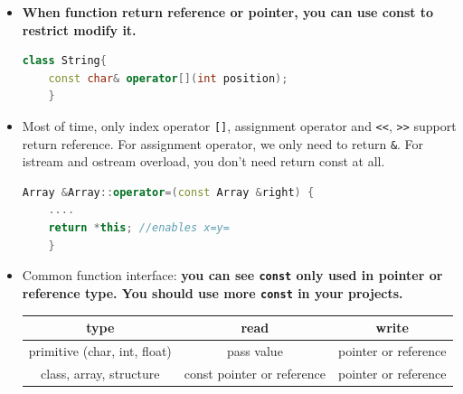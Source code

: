 \documentclass[a4paper,12pt,twoside]{book}
\begin{document}
\begin{itemize}
	\item \textbf{When function return reference or pointer, you can use const to restrict modify it.}
	\begin{lstlisting}[frame=single, language=c++]
	class String{
	const char& operator[](int position);
	}
	\end{lstlisting}
	
	\item Most of time, only index operator \verb=[]=, assignment operator and \texttt{<<}, \texttt{>>} support return reference. For assignment operator, we only need to return \texttt{\&}.  For istream and ostream overload, you don't need return const at all. 
	\begin{lstlisting}[frame=single, language=c++]
	Array &Array::operator=(const Array &right) {
	....
	return *this; //enables x=y= 
	}
	\end{lstlisting} 
	
	\item Common function interface: \textbf{you can see \texttt{const} only used in pointer or reference type. You should use more \texttt{const} in your projects. }
	
	\begin{tabular}{|c|c|c|}
		\hline
		\textbf{type} & \textbf{read} & \textbf{write} \\
		\hline
		primitive (char, int, float) & pass value & pointer or reference \\
		\hline
		class, array, structure  & const pointer or reference &  pointer or reference  \\
		\hline
	\end{tabular}
	
\end{itemize}
\end{document}
